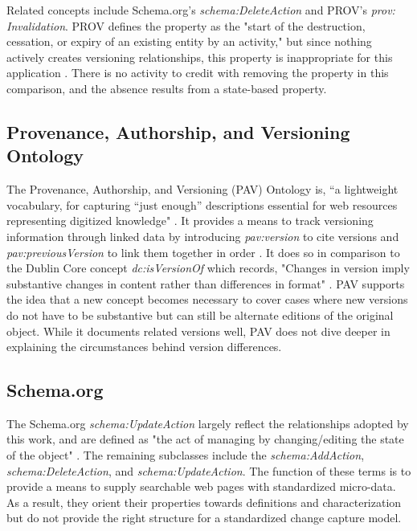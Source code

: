 Related concepts include Schema.org's \textit{schema:DeleteAction} and PROV's \textit{prov: Invalidation}.
PROV defines the property as the "start of the destruction, cessation, or expiry of an existing entity by an activity," but since nothing actively creates versioning relationships, this property is inappropriate for this application \cite{Lebo2013}.
There is no activity to credit with removing the property in this comparison, and the absence results from a state-based property.

\subsection{Provenance, Authorship, and Versioning Ontology}

The Provenance, Authorship, and Versioning (PAV) Ontology is, ``a lightweight vocabulary, for capturing ``just enough” descriptions essential for web resources representing digitized knowledge" \cite{Ciccarese2013}.
It provides a means to track versioning information through linked data by introducing \textit{pav:version} to cite versions and \textit{pav:previousVersion} to link them together in order \cite{Ciccarese2013}.
It does so in comparison to the Dublin Core concept \textit{dc:isVersionOf} which records, "Changes in version imply substantive changes in content rather than differences in format" \cite{DCMI2012}.
PAV supports the idea that a new concept becomes necessary to cover cases where new versions do not have to be substantive but can still be alternate editions of the original object.
While it documents related versions well, PAV does not dive deeper in explaining the circumstances behind version differences.

\subsection{Schema.org}

The Schema.org \textit{schema:UpdateAction} largely reflect the relationships adopted by this work, and are defined as "the act of managing by changing/editing the state of the object" \cite{Schema}.
The remaining subclasses include the \textit{schema:AddAction}, \textit{schema:DeleteAction}, and \textit{schema:UpdateAction}.
The function of these terms is to provide a means to supply searchable web pages with standardized micro-data.
As a result, they orient their properties towards definitions and characterization but do not provide the right structure for a standardized change capture model.

